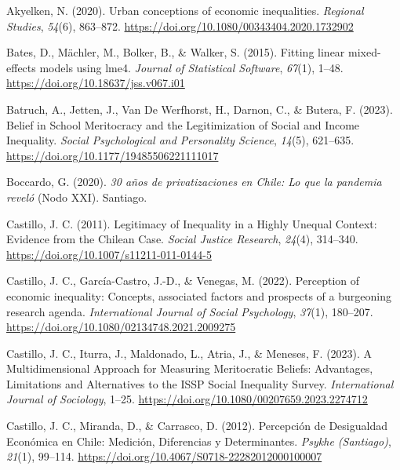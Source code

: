 \documentclass[
  12pt,
]{article}
\newlength{\cslhangindent}
\newenvironment{CSLReferences}[2] %
 {\begin{list}{}{%
  \setlength{\itemindent}{0pt}
  \setlength{\leftmargin}{0pt}
  \setlength{\parsep}{0pt}
  \ifodd #1
   \setlength{\leftmargin}{\cslhangindent}
   \setlength{\itemindent}{-1\cslhangindent}
  \fi
  \setlength{\itemsep}{#2\baselineskip}}}
 {\end{list}}
\begin{document}
\label{refs}
\begin{CSLReferences}{1}{0}
Akyelken, N. (2020). Urban conceptions of economic inequalities.
\emph{Regional Studies}, \emph{54}(6), 863--872.
\url{https://doi.org/10.1080/00343404.2020.1732902}

Bates, D., Mächler, M., Bolker, B., \& Walker, S. (2015). Fitting linear
mixed-effects models using {lme4}. \emph{Journal of Statistical
Software}, \emph{67}(1), 1--48.
\url{https://doi.org/10.18637/jss.v067.i01}

Batruch, A., Jetten, J., Van De Werfhorst, H., Darnon, C., \& Butera, F.
(2023). Belief in {School Meritocracy} and the {Legitimization} of
{Social} and {Income Inequality}. \emph{Social Psychological and
Personality Science}, \emph{14}(5), 621--635.
\url{https://doi.org/10.1177/19485506221111017}

Boccardo, G. (2020). \emph{30 a{ñ}os de privatizaciones en {Chile}: Lo
que la pandemia revel{ó}} (Nodo XXI). Santiago.

Castillo, J. C. (2011). Legitimacy of {Inequality} in a {Highly Unequal
Context}: {Evidence} from the {Chilean Case}. \emph{Social Justice
Research}, \emph{24}(4), 314--340.
\url{https://doi.org/10.1007/s11211-011-0144-5}

Castillo, J. C., García-Castro, J.-D., \& Venegas, M. (2022). Perception
of economic inequality: Concepts, associated factors and prospects of a
burgeoning research agenda. \emph{International Journal of Social
Psychology}, \emph{37}(1), 180--207.
\url{https://doi.org/10.1080/02134748.2021.2009275}

Castillo, J. C., Iturra, J., Maldonado, L., Atria, J., \& Meneses, F.
(2023). A {Multidimensional Approach} for {Measuring Meritocratic
Beliefs}: {Advantages}, {Limitations} and {Alternatives} to the {ISSP
Social Inequality Survey}. \emph{International Journal of Sociology},
1--25. \url{https://doi.org/10.1080/00207659.2023.2274712}

Castillo, J. C., Miranda, D., \& Carrasco, D. (2012). Percepci{ó}n de
{Desigualdad Econ{ó}mica} en {Chile}: {Medici{ó}n}, {Diferencias} y
{Determinantes}. \emph{Psykhe (Santiago)}, \emph{21}(1), 99--114.
\url{https://doi.org/10.4067/S0718-22282012000100007}


\end{CSLReferences}
\end{document}
